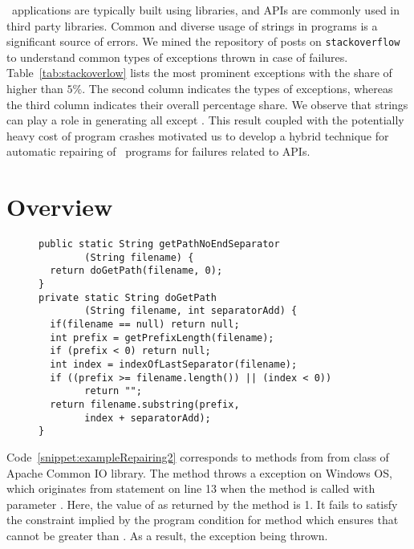 \java\ applications are typically built using libraries, and  APIs
are commonly used in third party libraries. Common and diverse usage of strings
in programs is a significant source of errors. We mined the repository of posts
on \texttt{stackoverflow}~\cite{stackoverflow} to understand common types of
exceptions thrown in case of failures. Table~\ref{tab:stackoverlow} lists the
most prominent exceptions with the share of higher than $5\%$. The second column
indicates the types of exceptions, whereas the third column indicates their
overall percentage share. We observe that strings can play a role in generating
all except . This result coupled with the potentially
heavy cost of program crashes motivated us to develop a hybrid technique for
automatic repairing of \java\ programs for failures related to 
APIs.

\section{Overview}
\label{subsec:overview}

\begin{figure}[t]
\centering
\begin{lstlisting}
public static String getPathNoEndSeparator
        (String filename) {
  return doGetPath(filename, 0);
}
private static String doGetPath
        (String filename, int separatorAdd) {
  if(filename == null) return null;
  int prefix = getPrefixLength(filename);
  if (prefix < 0) return null;
  int index = indexOfLastSeparator(filename);
  if ((prefix >= filename.length()) || (index < 0))
        return "";
  return filename.substring(prefix,
        index + separatorAdd);
}
\end{lstlisting}
\end{figure}

Code~\ref{snippet:exampleRepairing2} corresponds to methods from from
 class of Apache Common IO library. The method
 throws a  exception
on Windows OS, which originates from statement  on line 13 when the method is
called with parameter .  Here, the value of  as
returned by the method  is 1. It fails to satisfy the
constraint implied by the program condition  for  method which  ensures that 
cannot be greater than . As a result, the exception being thrown.



